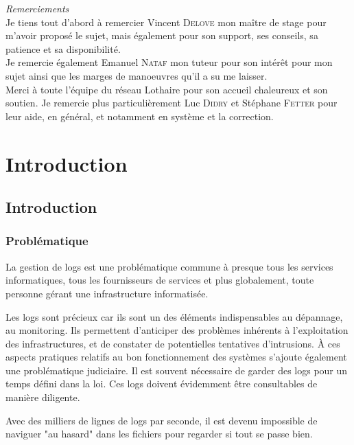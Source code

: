 \documentclass[a4paper,12pt,one side,titlepage]{report}
\begin{document}




\emph{\Large Remerciements}
\\[2cm]
Je tiens tout d'abord à remercier Vincent \textsc{Delove} mon maître de stage pour 
m'avoir proposé le sujet, mais également pour son support, ses conseils, sa patience
et sa disponibilité.
\\[2cm]
Je remercie également Emanuel \textsc{Nataf} mon tuteur pour  son intérêt pour mon 
sujet ainsi que les marges de manoeuvres qu'il a su me laisser.
\\[1cm]
Merci à toute l'équipe du réseau Lothaire pour son accueil chaleureux et son soutien.
Je remercie plus particulièrement  Luc \textsc{Didry} et Stéphane \textsc{Fetter} pour leur
aide, en général, et  notamment en système et la correction.

\setcounter{tocdepth}{1}
\tableofcontents

\part{Introduction}

\chapter{Introduction}
\section{Problématique}
La gestion de \gls{logs} est une problématique commune à presque tous les services informatiques,
tous les fournisseurs de services et plus globalement, toute personne gérant une infrastructure 
informatisée.

Les \gls{logs} sont précieux car ils sont un des éléments indispensables au dépannage, 
au monitoring. Ils permettent d'anticiper des problèmes inhérents à l'exploitation 
des infrastructures, et  de constater de potentielles tentatives d'intrusions.
À ces aspects pratiques relatifs au bon fonctionnement des systèmes s'ajoute également
une problématique judiciaire. Il est souvent nécessaire de garder des logs pour un 
temps défini  dans la loi. Ces logs doivent évidemment être consultables de manière
diligente.

Avec des milliers de lignes de logs par seconde, il est devenu impossible de naviguer
"au hasard" dans les fichiers pour regarder si tout se passe bien.
\end{document}
